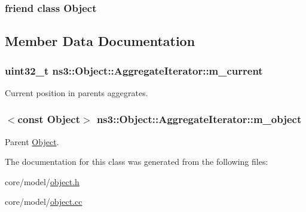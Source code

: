 \subsubsection[{\texorpdfstring{Object}{Object}}]{\setlength{\rightskip}{0pt plus 5cm}friend class {\bf Object}\hspace{0.3cm}{\ttfamily [friend]}}\hypertarget{classns3_1_1Object_1_1AggregateIterator_a0720b5f434e636e22a3ed34f847eec57}{}\label{classns3_1_1Object_1_1AggregateIterator_a0720b5f434e636e22a3ed34f847eec57}


\subsection{Member Data Documentation}
\subsubsection[{\texorpdfstring{m\+\_\+current}{m_current}}]{\setlength{\rightskip}{0pt plus 5cm}uint32\+\_\+t ns3\+::\+Object\+::\+Aggregate\+Iterator\+::m\+\_\+current\hspace{0.3cm}{\ttfamily [private]}}\hypertarget{classns3_1_1Object_1_1AggregateIterator_accdd67b89627711dda3947f878f124bd}{}\label{classns3_1_1Object_1_1AggregateIterator_accdd67b89627711dda3947f878f124bd}


Current position in parent\textquotesingle{}s aggegrates. 

\subsubsection[{\texorpdfstring{m\+\_\+object}{m_object}}]{$<$const {\bf Object}$>$ ns3\+::\+Object\+::\+Aggregate\+Iterator\+::m\+\_\+object\hspace{0.3cm}{\ttfamily [private]}}\hypertarget{classns3_1_1Object_1_1AggregateIterator_a5d28de5523e0b72ef19174bd76355ab1}{}\label{classns3_1_1Object_1_1AggregateIterator_a5d28de5523e0b72ef19174bd76355ab1}


Parent \hyperlink{classns3_1_1Object}{Object}. 



The documentation for this class was generated from the following files\+:\begin{DoxyCompactItemize}
\item 
core/model/\hyperlink{object_8h}{object.\+h}\item 
core/model/\hyperlink{object_8cc}{object.\+cc}\end{DoxyCompactItemize}

